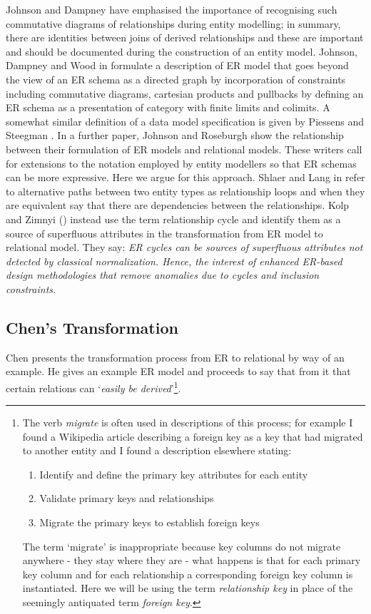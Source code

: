 Johnson and Dampney \cite{Johnson93} have emphasised the 
importance of recognising such commutative diagrams of 
relationships during entity modelling; 
in summary, there are identities between joins of derived 
relationships and these are important
and should be documented during the construction of an entity model. 
Johnson, Dampney and Wood in \cite{Johnson2002ERA} formulate a description of 
ER model that goes beyond the view of an ER schema as a directed graph 
by incorporation of constraints including commutative diagrams, cartesian products and 
pullbacks by defining an ER schema as a presentation of category with 
finite limits and colimits.  
A somewhat similar definition of a data model specification is given by Piessens and Steegman \cite{piessens1995}.
In a further paper, Johnson and Roseburgh  \cite{johnson2002REL} show the 
relationship between their formulation of ER models and relational models. 
These writers call for extensions to the notation employed by entity modellers so that ER schemas can be more expressive. Here we argue for this approach.  
Shlaer and Lang in \cite{Shlaer96} refer  to alternative paths between two entity types as relationship loops and when they are equivalent say that there are dependencies between the relationships.  
Kolp and Zimnyi (\cite{Kolp1995}) instead use the term relationship cycle and identify them as a source of 
superfluous attributes in the transformation from ER model to relational model. They say: \textit{ER cycles can be sources of 
superfluous attributes not detected by classical normalization. Hence, the interest of enhanced ER-based design methodologies that remove anomalies due to cycles and inclusion constraints.}


\subsection{Chen's Transformation}
\label{ChensTransformation}

Chen presents the transformation process from ER to relational by way of an example. 
He gives an example ER model and proceeds to say that from it that certain relations can `\textit{easily be derived}'\footnote{The verb \textit{migrate} is often used in descriptions of this process; for example I found a Wikipedia article describing a foreign key as a key that had migrated to another entity and I found a description elsewhere stating:
\begin{enumerate}
\item {Identify and define the primary key attributes for each entity}
\item {Validate primary keys and relationships}
\item {Migrate the primary keys to establish foreign keys}
\end{enumerate} The term `migrate' is inappropriate because key columns do not migrate anywhere - they stay where they are - what happens is that for each primary key column and for each relationship a corresponding foreign key column is instantiated. Here we will be using the term \textit{relationship key} in place of the seemingly antiquated term \textit{foreign key}.
}. 

